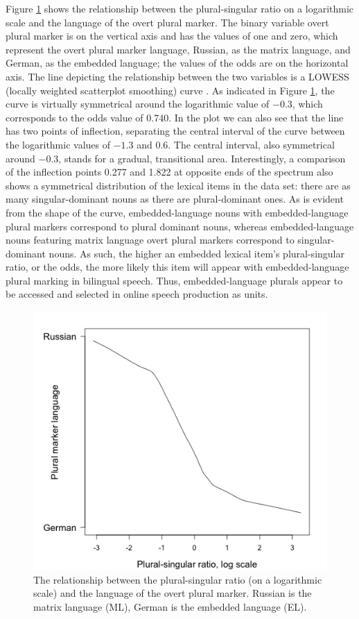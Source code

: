 Figure \ref{fig:6:2} shows the relationship between the plural-singular ratio on a logarithmic scale and the language of the overt plural marker. The binary variable overt plural marker is on the vertical axis and has the values of one and zero, which represent the overt plural marker language, Russian, as the matrix language, and German, as the embedded language; the values of the odds are on the horizontal axis. The line depicting the relationship between the two variables is a LOWESS (locally weighted scatterplot smoothing) curve \citep{lowess}. As indicated in Figure \ref{fig:6:2}, the curve is virtually symmetrical around the logarithmic value of $-0.3$, which corresponds to the odds value of 0.740. In the plot we can also see that the line has two points of inflection, separating the central interval of the curve between the logarithmic values of $-1.3$ and 0.6. The central interval, also symmetrical around $-0.3$, stands for a gradual, transitional area. Interestingly, a comparison of the inflection points 0.277 and 1.822 at opposite ends of the spectrum also shows a symmetrical distribution of the lexical items in the data set: there are as many singular-dominant nouns as there are plural-dominant ones. As is evident from the shape of the curve, embedded-language nouns with embedded-language plural markers correspond to plural dominant nouns, whereas embedded-language nouns  featuring matrix language overt plural markers correspond to singular-dominant nouns. As such, the higher an embedded lexical item’s plural-singular ratio, or the odds, the more likely this item will appear with embedded-language plural marking in bilingual speech. Thus, embedded-language plurals appear to be accessed and selected in online speech production as units.

\begin{figure}
\includegraphics[scale=0.5]{figures/6-Figure_2.png}
\caption{The relationship between the plural-singular ratio (on a logarithmic scale) and the language of the overt plural marker. Russian is the matrix language (ML), German is the embedded language (EL).\label{fig:6:2}}
\end{figure}

